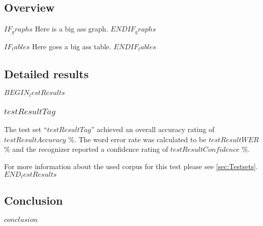 \documentclass[a4paper,10pt,bibtotoc]{scrartcl}
\begin{document}
\begin{multicols}{2}
\subsection{Overview}

$IF_graphs$
Here is a big ass graph.
$ENDIF_graphs$

$IF_tables$
Here goes a big ass table.
$ENDIF_tables$

\subsection{Detailed results}

$BEGIN_testResults$
\subsubsection{$testResultTag$}

The test set ``$testResultTag$'' achieved an overall accuracy rating of $testResultAccuracy$ \%. The word error rate was calculated to be $testResultWER$ \% and the recognizer reported a confidence rating of $testResultConfidence$ \%.

For more information about the used corpus for this test please see \ref{sec:Testsets}.
$END_testResults$


\subsection{Conclusion}
$conclusion$

\end{multicols}
\end{document}
